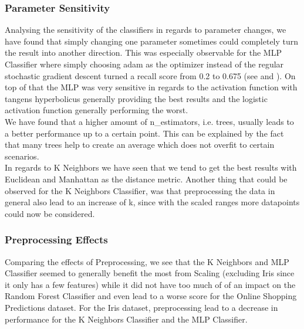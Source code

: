\subsubsection{Parameter Sensitivity}
Analysing the sensitivity of the classifiers in regards to parameter changes, we have found that simply changing one parameter sometimes could completely turn the result into another direction. This was especially observable for the MLP Classifier where simply choosing adam as the optimizer instead of the regular stochastic gradient descent turned a recall score from 0.2 to 0.675 (see  and ). On top of that the MLP was very sensitive in regards to the activation function with tangens hyperbolicus generally providing the best results and the logistic activation function generally performing the worst.\\
We have found that a higher amount of n\_estimators, i.e. trees, usually leads to a better performance up to a certain point. This can be explained by the fact that many trees help to create an average which does not overfit to certain scenarios.\\
In regards to K Neighbors we have seen that we tend to get the best results with Euclidean and Manhattan as the distance metric.  
Another thing that could be observed for the K Neighbors Classifier, was that preprocessing the data in general also lead to an increase of k, since with the scaled ranges  more datapoints could now be considered. \\
\newline
\subsubsection{Preprocessing Effects}
Comparing the effects of Preprocessing, we see that the K Neighbors and MLP Classifier seemed to generally benefit the most from Scaling (excluding Iris since it only has a few features) while it did not have too much of of an impact on the Random Forest Classifier and even lead to a worse score for the Online Shopping Predictions dataset. For the Iris dataset, preprocessing lead to a decrease in performance for the K Neighbors Classifier and the MLP Classifier.

